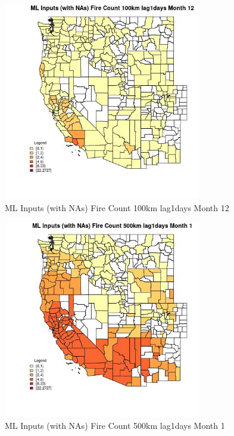\begin{figure} 
\centering  
\includegraphics[width=0.77\textwidth]{Code_Outputs/Report_ML_input_PM25_Step4_part_f_de_duplicated_aves_prioritize_24hr_obswNAs_CountyFire_Count_100km_lag1daysmedianMonth12.jpg} 
\caption{\label{fig:Report_ML_input_PM25_Step4_part_f_de_duplicated_aves_prioritize_24hr_obswNAsCountyFire_Count_100km_lag1daysmedianMonth12}ML Inputs (with NAs) Fire Count 100km lag1days Month 12} 
\end{figure} 
 

\begin{figure} 
\centering  
\includegraphics[width=0.77\textwidth]{Code_Outputs/Report_ML_input_PM25_Step4_part_f_de_duplicated_aves_prioritize_24hr_obswNAs_CountyFire_Count_500km_lag1daysmedianMonth1.jpg} 
\caption{\label{fig:Report_ML_input_PM25_Step4_part_f_de_duplicated_aves_prioritize_24hr_obswNAsCountyFire_Count_500km_lag1daysmedianMonth1}ML Inputs (with NAs) Fire Count 500km lag1days Month 1} 
\end{figure} 
 

